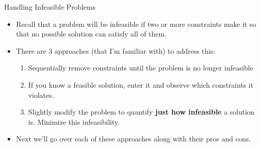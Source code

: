 \documentclass[10pt, aspectratio=169]{beamer}
\begin{document}
\begin{frame}{Handling Infeasible Problems}
    \begin{itemize}
        \item Recall that a problem will be infeasible if two or more constraints make it so that no possible solution can satisfy all of them.
        \item There are 3 approaches (that I'm familiar with) to address this:
        \begin{enumerate}
            \item Sequentially remove constraints until the problem is no longer infeasible
            \item If you know a feasible solution, enter it and observe which constraints it violates.
            \item Slightly modify the problem to quantify \textbf{just how infeasible} a solution is. Minimize this infeasibility.
        \end{enumerate}
        \item Next we'll go over each of these approaches along with their pros and cons.
    \end{itemize}
\end{frame}
\end{document}
